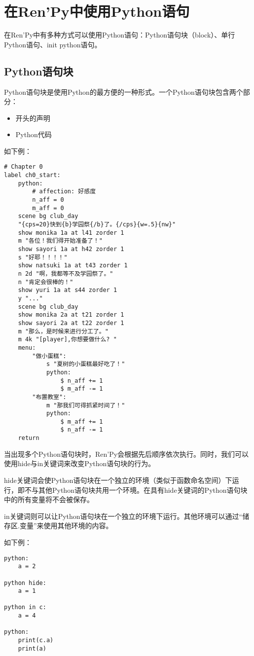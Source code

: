 \documentclass[../../Main.tex]{subfiles}
\begin{document}
\section{在Ren'Py中使用Python语句}
\label{sec:4.3}
在Ren'Py中有多种方式可以使用Python语句：Python语句块（block）、单行Python语句、init python语句。

\subsection{Python语句块}
Python语句块是使用Python的最方便的一种形式。一个Python语句块包含两个部分：
\begin{itemize}
    \item 开头的声明
    \item Python代码
\end{itemize}

如下例：

\begin{lstlisting}
# Chapter 0
label ch0_start:
    python:
        # affection: 好感度
        n_aff = 0
        m_aff = 0
    scene bg club_day
    "{cps=20}快到{b}学园祭{/b}了。{/cps}{w=.5}{nw}"
    show monika 1a at l41 zorder 1
    m "各位！我们得开始准备了！"
    show sayori 1a at h42 zorder 1
    s "好耶！！！！"
    show natsuki 1a at t43 zorder 1
    n 2d "啊，我都等不及学园祭了。"
    n "肯定会很棒的！"
    show yuri 1a at s44 zorder 1
    y "..."
    scene bg club_day
    show monika 2a at t21 zorder 1
    show sayori 2a at t22 zorder 1
    m "那么，是时候来进行分工了。"
    m 4k "[player],你想要做什么? "
    menu:
        "做小蛋糕":
            s "夏树的小蛋糕最好吃了！"
            python:
                $ n_aff += 1
                $ m_aff -= 1
        "布置教室":
            m "那我们可得抓紧时间了！"
            python:
                $ m_aff += 1
                $ n_aff -= 1
    return

\end{lstlisting}

当出现多个Python语句块时，Ren'Py会根据先后顺序依次执行。同时，我们可以使用hide与in关键词来改变Python语句块的行为。

hide关键词会使Python语句块在一个独立的环境（类似于函数命名空间）下运行，即不与其他Python语句块共用一个环境。在具有hide关键词的Python语句块中的所有变量将不会被保存。

in关键词则可以让Python语句块在一个独立的环境下运行。其他环境可以通过“储存区.变量”来使用其他环境的内容。

如下例：
\begin{lstlisting}
python:
    a = 2

python hide:
    a = 1

python in c:
    a = 4

python:
    print(c.a)
    print(a)
\end{lstlisting}
\end{document}
